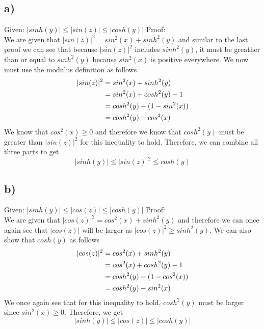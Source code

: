 \documentclass[notitlepage]{article}
\begin{document}
    \subsection*{a)} 
    Given: $|sinh(y)| \leq |sin(z)| \leq |cosh(y)|$
    Proof: \\
    We are given that $|sin(z)|^2 = sin^2(x) + sinh^2(y)$ and similar to the last proof we can see that because $|sin(z)|^2$ includes $sinh^2(y)$, it must be greather than
    or equal to $sinh^2(y)$ because $sin^2(x)$ is positive everywhere. We now must use the modulus definition as follows
\begin{equation}
    \begin{aligned}
        |sin(z)|^2  &= sin^2(x) + sinh^2(y) \notag \\
                    &= sin^2(x) + cosh^2(y)-1 \\
                    &= cosh^2(y) - (1 - sin^2(x)) \\
                    &= cosh^2(y) - cos^2(x)
    \end{aligned}
\end{equation}
    We know that $cos^2(x) \geq 0$ and therefore we know that $cosh^2(y)$ must be greater than $|sin(z)|^2$ for this inequality to hold. Therefore, we can combine all three parts to get
    $$|sinh(y)| \leq |sin(z)|^2 \leq cosh(y)$$
     
     \subsection*{b)}
     Given: $|sinh(y)| \leq |cos(z)| \leq |cosh(y)|$
    Proof: \\
    We are given that $|cos(z)|^2 = cos^2(x) + sinh^2(y)$ and therefore we can once again see that $|cos(z)|$ will be larger as $|cos(z)|^2 \geq sinh^2(y)$. We can also show that 
    $cosh(y)$ as follows
\begin{equation}
    \begin{aligned}
        |cos(z)|^2  &= cos^2(x) + sinh^2(y) \notag \\
                    &= cos^2(x) + cosh^2(y)-1 \\
                    &= cosh^2(y) - (1 - cos^2(x)) \\
                    &= cosh^2(y) - sin^2(x)
    \end{aligned}
\end{equation}
    We once again see that for this inequality to hold, $cosh^2(y)$ must be larger since $sin^2(x) \geq 0$. Therefore, we get 
    $$|sinh(y)| \leq |cos(z)| \leq |cosh(y)|$$ \\
    
\end{document}
